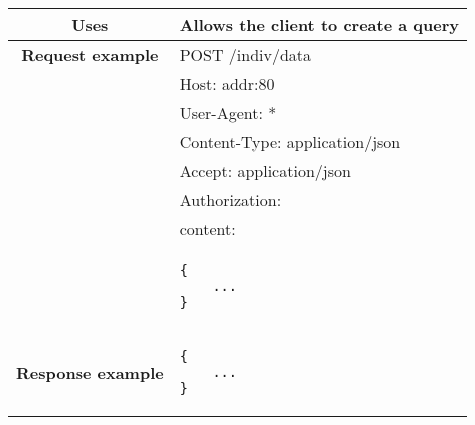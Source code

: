 \begin{adjustwidth}{1cm}{}
\begin{longtable}{|c|l|}
            \textbf{Uses} & Allows the client to create a query \\
            \hline
               \textbf{Request example}
             & POST /indiv/data \\
             & Host: addr:80\\
             & User-Agent: * \\
             & Content-Type: application/json\\
             & Accept: application/json\\
             & Authorization: \\
             & content: \\
            & \begin{minipage}[t]{0.5\textwidth}
                \begin{adjustwidth}{1.5cm}{}
                \begin{verbatim}
{
    ...
}
                \end{verbatim}
                \end{adjustwidth}
              \end{minipage} \\
              \hline
             \textbf{Response example} & 
              \begin{minipage}[t]{0.5\textwidth}
                \begin{adjustwidth}{1.5cm}{}
                \begin{verbatim}
{
    ...
}
                \end{verbatim}
                \end{adjustwidth}
              \end{minipage} \\
              \hline
        \end{longtable}
    \end{adjustwidth} 
    
